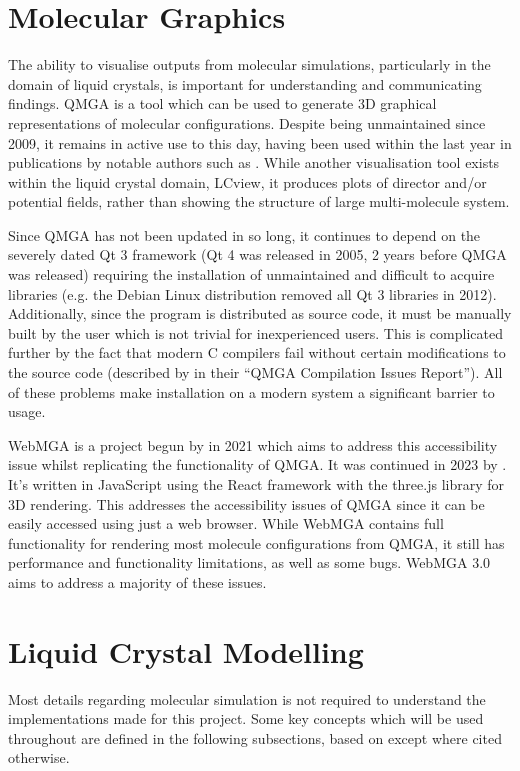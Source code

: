 \section{Molecular Graphics}
The ability to visualise outputs from molecular simulations, particularly in the domain of liquid crystals, is important for understanding and communicating findings. QMGA\cite{gabriel2008molecular} is a tool which can be used to generate 3D graphical representations of molecular configurations. Despite being unmaintained since 2009\cite{qmga_release}, it remains in active use to this day, having been used within the last year in publications by notable authors such as \textcite{ramirez2023densest,mazzilli2023phase}. While another visualisation tool exists within the liquid crystal domain, LCview\cite{james2006finite,LCview}, it produces plots of director and/or potential fields, rather than showing the structure of large multi-molecule system.

Since QMGA has not been updated in so long, it continues to depend on the severely dated Qt 3 framework (Qt 4 was released in 2005, 2 years before QMGA was released) requiring the installation of unmaintained and difficult to acquire libraries (e.g. the Debian Linux distribution removed all Qt 3 libraries in 2012\cite{qt3_removed}). Additionally, since the program is distributed as source code, it must be manually built by the user which is not trivial for inexperienced users. This is complicated further by the fact that modern C compilers fail without certain modifications to the source code (described by \textcite{Battistini_2021} in their ``QMGA Compilation Issues Report''). All of these problems make installation on a modern system a significant barrier to usage.

WebMGA is a project begun by \textcite{Battistini_2021} in 2021 which aims to address this accessibility issue whilst replicating the functionality of QMGA. It was continued in 2023 by \textcite{webmga_2}. It's written in JavaScript using the React framework with the three.js library for 3D rendering. This addresses the accessibility issues of QMGA since it can be easily accessed using just a web browser. While WebMGA contains full functionality for rendering most molecule configurations from QMGA, it still has performance and functionality limitations, as well as some bugs. WebMGA 3.0 aims to address a majority of these issues.

\section{Liquid Crystal Modelling}
Most details regarding molecular simulation is not required to understand the implementations made for this project. Some key concepts which will be used throughout are defined in the following subsections, based on \textcite{allen2017computer} except where cited otherwise.

